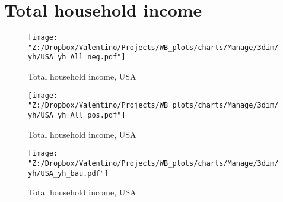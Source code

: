 \documentclass[12pt, letterpaper]{article}
\begin{document}
\newpage
\section{Total household income}
\begin{figure}[H]
\caption{Total household income, USA}
\label{fig_USA_yh_All_neg}
\centering
\texttt{[image: "Z:/Dropbox/Valentino/Projects/WB\_plots/charts/Manage/3dim/yh/USA\_yh\_All\_neg.pdf"]}
\end{figure}
\begin{figure}[H]
\caption{Total household income, USA}
\label{fig_USA_yh_All_pos}
\centering
\texttt{[image: "Z:/Dropbox/Valentino/Projects/WB\_plots/charts/Manage/3dim/yh/USA\_yh\_All\_pos.pdf"]}
\end{figure}
\begin{figure}[H]
\caption{Total household income, USA}
\label{fig_USA_yh_bau}
\centering
\texttt{[image: "Z:/Dropbox/Valentino/Projects/WB\_plots/charts/Manage/3dim/yh/USA\_yh\_bau.pdf"]}
\end{figure}
\end{document}
